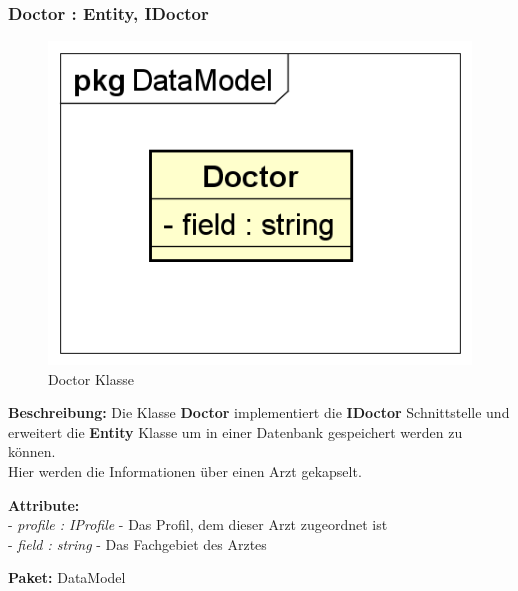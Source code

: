 \documentclass[a4paper]{scrreprt}
\begin{document}
\subsubsection{Doctor : Entity, IDoctor}
\begin{figure}[H]
\centering
\includegraphics[width=0.75\textheight]{graphics/Klassendiagramme/Model/Doctor.png}
\caption{Doctor Klasse}
\end{figure}
\textbf{Beschreibung:} Die Klasse \textbf{Doctor} implementiert die \textbf{IDoctor} Schnittstelle und erweitert die \textbf{Entity} Klasse um in einer Datenbank gespeichert werden zu können.\\
Hier werden die Informationen über einen Arzt gekapselt.

\textbf{Attribute:}\\ 
- \textit{profile : IProfile} - Das Profil, dem dieser Arzt zugeordnet ist\\
- \textit{field : string} - Das Fachgebiet des Arztes

\textbf{Paket:} DataModel
\end{document}
